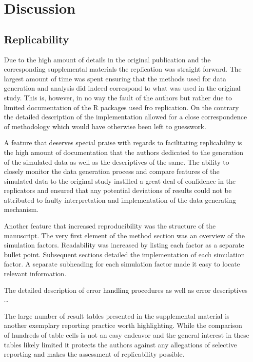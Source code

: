 \documentclass[10,a4paperpaper,]{article}
\begin{document}
\FloatBarrier
\section{Discussion}

\subsection{Replicability}

Due to the high amount of details in the original publication and the
corresponding supplemental materials the replication was straight
forward. The largest amount of time was spent ensuring that the methods
used for data generation and analysis did indeed correspond to what was
used in the original study. This is, however, in no way the fault of the
authors but rather due to limited documentation of the R packages used
fro replication. On the contrary the detailed description of the
implementation allowed for a close correspondence of methodology which
would have otherwise been left to guesswork.

A feature that deserves special praise with regards to facilitating
replicability is the high amount of documentation that the authors
dedicated to the generation of the simulated data as well as the
descriptives of the same. The ability to closely monitor the data
generation process and compare features of the simulated data to the
original study instilled a great deal of confidence in the replicators
and ensured that any potential deviations of results could not be
attributed to faulty interpretation and implementation of the data
generating mechanism.

Another feature that increased reproducibility was the structure of the
manuscript. The very first element of the method section was an overview
of the simulation factors. Readability was increased by listing each
factor as a separate bullet point. Subsequent sections detailed the
implementation of each simulation factor. A separate subheading for each
simulation factor made it easy to locate relevant information.

The detailed description of error handling procedures as well as error
descriptives \ldots{}

The large number of result tables presented in the supplemental material
is another exemplary reporting practice worth highlighting. While the
comparison of hundreds of table cells is not an easy endeavor and the
general interest in these tables likely limited it protects the authors
against any allegations of selective reporting and makes the assessment
of replicability possible.
\end{document}
